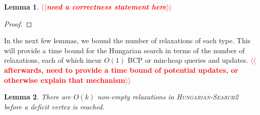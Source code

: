 \documentclass[11pt]{article}
\makeatletter
\def\eps{\varepsilon}
\theoremstyle{plain}
\newtheorem{lemma}{Lemma}
\def\n@te#1{\textsf{\boldmath \textbf{$\langle\!\langle$#1$\rangle\!\rangle$}}\leavevmode}
\def\note#1{\textcolor{red}{\n@te{#1}}}
\makeatother
\begin{document}
\begin{lemma}
\label{lemma:empty_correct}
\note{need a correctness statement here}
\end{lemma}

\begin{proof}
\end{proof}







In the next few lemmas, we bound the number of relaxations of each type.
This will provide a time bound for the Hungarian search in terms of the
number of relaxations, each of which incur $O(1)$ BCP or min-heap queries and 
updates.
\note{afterwards, need to provide a time bound of potential updates, or otherwise explain that mechanism}

\begin{lemma}
\label{lemma:goldberg_hs_length1}
There are $O(k)$ non-empty relaxations in \textsc{Hungarian-Search2} before a
deficit vertex is reached.
\end{lemma}
\end{document}
